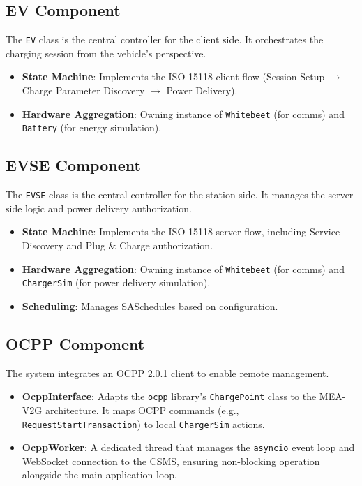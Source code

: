 \documentclass[a4paper,11pt]{report}
\begin{document}
\subsection{EV Component}
The \texttt{EV} class is the central controller for the client side. It orchestrates the charging session from the vehicle's perspective.
\begin{itemize}
    \item \textbf{State Machine}: Implements the ISO 15118 client flow (Session Setup $\rightarrow$ Charge Parameter Discovery $\rightarrow$ Power Delivery).
    \item \textbf{Hardware Aggregation}: Owning instance of \texttt{Whitebeet} (for comms) and \texttt{Battery} (for energy simulation).
\end{itemize}

\subsection{EVSE Component}
The \texttt{EVSE} class is the central controller for the station side. It manages the server-side logic and power delivery authorization.
\begin{itemize}
    \item \textbf{State Machine}: Implements the ISO 15118 server flow, including Service Discovery and Plug \& Charge authorization.
    \item \textbf{Hardware Aggregation}: Owning instance of \texttt{Whitebeet} (for comms) and \texttt{ChargerSim} (for power delivery simulation).
    \item \textbf{Scheduling}: Manages SASchedules based on configuration.
\end{itemize}

\subsection{OCPP Component}
The system integrates an OCPP 2.0.1 client to enable remote management.
\begin{itemize}
    \item \textbf{OcppInterface}: Adapts the \texttt{ocpp} library's \texttt{ChargePoint} class to the MEA-V2G architecture. It maps OCPP commands (e.g., \texttt{RequestStartTransaction}) to local \texttt{ChargerSim} actions.
    \item \textbf{OcppWorker}: A dedicated thread that manages the \texttt{asyncio} event loop and WebSocket connection to the CSMS, ensuring non-blocking operation alongside the main application loop.
\end{itemize}
\end{document}
